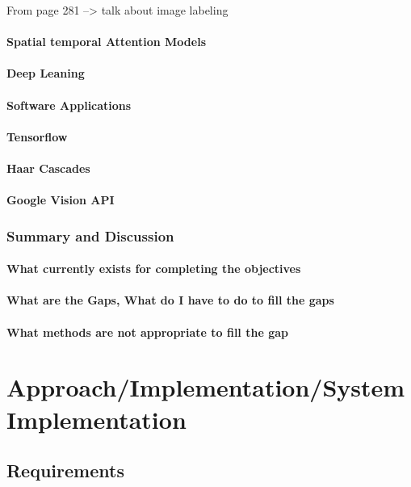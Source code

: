 \documentclass{mproj}
\begin{document}
From page 281 --> talk about image labeling

\subsubsection{Spatial temporal Attention Models}
\subsubsection{Deep Leaning}
\subsubsection{Software Applications}
\subsubsection{Tensorflow}
\subsubsection{Haar Cascades}
\subsubsection{Google Vision API}

\subsection{Summary and Discussion}
\subsubsection{What currently exists for completing the objectives}
\subsubsection{What are the Gaps, What do I have to do to fill the gaps}
\subsubsection{What methods are not appropriate to fill the gap}




\chapter{Approach/Implementation/System Implementation}

\section{Requirements}
\end{document}
